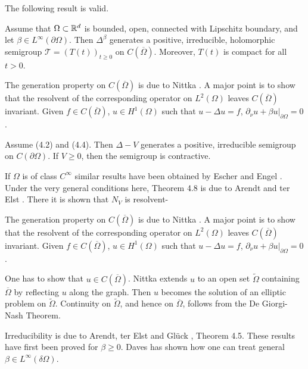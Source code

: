 The following result is valid.

\begin{theorem}[4.3]
Assume that $\Omega \subset \mathbb{R}^d$ is bounded, open, connected with Lipschitz boundary, and let $\beta \in L^\infty(\partial\Omega)$. Then $\Delta^\beta$ generates a positive, irreducible, holomorphic semigroup $\mathcal{T} = (T(t))_{t \geq 0}$ on $C(\overline{\Omega})$. Moreover, $T(t)$ is compact for all $t > 0$.
\end{theorem}

The generation property on $C(\overline{\Omega})$ is due to Nittka \cite{Ni11}. A major point is to show that the resolvent of the corresponding operator on $L^2(\Omega)$ leaves $C(\overline{\Omega})$ invariant. Given $f \in C(\overline{\Omega})$, $u \in H^1(\Omega)$ such that $u - \Delta u = f$, $\partial_\nu u + \beta u|_{\partial\Omega} = 0$.


\begin{theorem}[4.4]
Assume (4.2) and (4.4). Then $\Delta - V$ generates a positive, irreducible semigroup on $C(\partial\Omega)$. If $V \geq 0$, then the semigroup is contractive.
\end{theorem}

If $\Omega$ is of class $C^\infty$ similar results have been obtained by Escher \cite{Es94} and Engel \cite{En03}. Under the very general conditions here, Theorem 4.8 is due to Arendt and ter Elst \cite{AtE20}. There it is shown that $N_V$ is resolvent-

The generation property on $C(\overline{\Omega})$ is due to Nittka \cite{Ni11}. A major point is to show that the resolvent of the corresponding operator on $L^2(\Omega)$ leaves $C(\overline{\Omega})$ invariant. Given $f \in C(\overline{\Omega})$, $u \in H^1(\Omega)$ such that $u - \Delta u = f$, $\partial_\nu u + \beta u|_{\partial\Omega} = 0$.

One has to show that $u \in C(\overline{\Omega})$. Nittka extends $u$ to an open set $\widetilde{\Omega}$ containing $\overline{\Omega}$ by reflecting $u$ along the graph. Then $u$ becomes the solution of an elliptic problem on $\widetilde{\Omega}$. Continuity on $\widetilde{\Omega}$, and hence on $\overline{\Omega}$, follows from the De Giorgi-Nash Theorem.

Irreducibility is due to Arendt, ter Elst and Glück \cite{AEG20}, Theorem 4.5.
These results have first been proved for $ \beta \geq 0 $.
Daves \cite{Dav09} has shown how one can treat general $ \beta \in L^{\infty}( \delta \Omega ) $.

